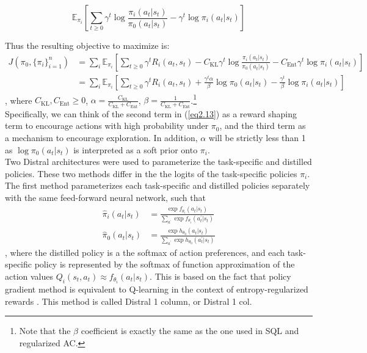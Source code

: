 \documentclass[12pt]{report}
\begin{document}
$$\mathbb{E}_{\pi_i}\left[\sum_{t\ge 0} \gamma^t \log{\frac{\pi_i(a_t|s_t)}{\pi_0(a_t|s_t)}} - \gamma^t \log{\pi_i(a_t|s_t)}\right]$$

Thus the resulting objective to maximize is:
\begin{align}
J(\pi_0, \{\pi_i\}_{i=1}^n) &= \sum_i \mathbb{E}_{\pi_i} \left[\sum_{t\ge 0} \gamma^t R_i(a_t,s_t) - C_\text{KL} \gamma^t \log{\frac{\pi_i(a_t|s_t)}{\pi_0(a_t|s_t)}} - C_{\text{Ent}} \gamma^t \log{\pi_i(a_t|s_t)}\right] \nonumber\\ 
&= \sum_i \mathbb{E}_{\pi_i} \left[\sum_{t\ge 0} \gamma^t R_i(a_t,s_t) + \frac{\gamma^t\alpha}{\beta} \log{\pi_0(a_t|s_t)} - \frac{\gamma^t}{\beta} \log{\pi_i(a_t|s_t)}\right] \label{eq2.13}
\end{align}
, where $C_\text{KL}, C_{\text{Ent}} \ge 0$, $\alpha = \frac{C_\text{KL}}{C_\text{KL}+C_{\text{Ent}}}$, $\beta = \frac{1}{C_\text{KL}+C_{\text{Ent}}}$.\footnote{Note that the $\beta$ coefficient is exactly the same as the one used in SQL and regularized AC.}\\

Specifically, we can think of the second term in (\ref{eq2.13}) as a reward shaping term to encourage actions with high probability under $\pi_0$, and the third term as a mechanism to encourage exploration. In addition, $\alpha$ will be strictly less than 1 as $\log{\pi_0(a_t|s_t)}$ is interpreted as a soft prior onto $\pi_i$.\\

Two Distral architectures \cite{teh2017distral} were used to parameterize the task-specific and distilled policies. These two methods differ in the the logits of the task-specific policies $\pi_i$. The first method parameterizes each task-specific and distilled policies separately with the same feed-forward neural network, such that
\begin{align}
    \hat{\pi}_i(a_t|s_t) &= \frac{\exp{f_{\theta_i}(a_t|s_t)}}{\sum_{a^\prime}\exp{f_{\theta_i}(a^\prime_t|s_t)}} \label{eq:logit1}\\ 
    \hat{\pi}_0(a_t|s_t) &= \frac{\exp{h_{\theta_0}(a_t|s_t)}}{\sum_{a^\prime}\exp{h_{\theta_0}(a^\prime_t|s_t)}} \label{eq2.15}
\end{align}
, where the distilled policy is a the softmax of action preferences, and  each task-specific policy is represented by the softmax of function approximation of the action values $Q_i(s_t,a_t) \approx f_{\theta_i}(a_t|s_t)$. This is based on the fact that policy gradient method is equivalent to Q-learning in the context of entropy-regularized rewards \cite{zhang2019pretrain}. This method is called Distral 1 column, or Distral 1 col.\\
\end{document}
